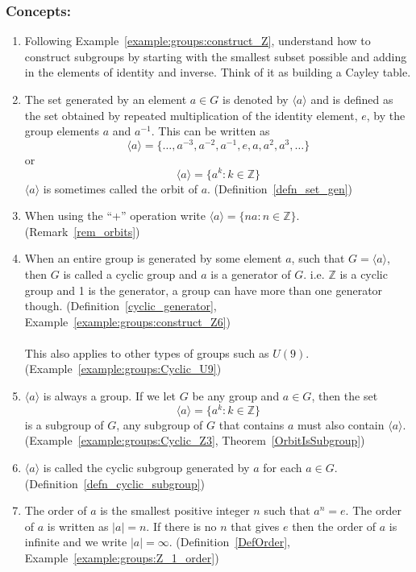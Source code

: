 \subsubsection*{Concepts:}
\begin{enumerate}
\item 
Following Example~\ref{example:groups:construct_Z}, understand how to construct subgroups by starting with the smallest subset possible and adding in the elements of identity and inverse.  Think of it as building a Cayley table.

\item
The set generated by an element $a \in G$ is denoted by $\langle a \rangle$ and is defined as the set obtained by repeated multiplication of the identity element, $e$, by the group elements $a$ and $a^{-1}$.  This can be written as  \[ \langle a \rangle = \{ \ldots, a^{-3}, a^{-2}, a^{-1}, e, a, a^2, a^3, \ldots \} \] or \[ \langle a \rangle = \{ a^{k} : k \in \mathbb Z \} \] $\langle a \rangle$ is sometimes called the orbit of $a$. (Definition~\ref{defn_set_gen})

\item
When using the ``+'' operation write $\langle a \rangle  = \{ na : n \in {\mathbb Z} \}$. (Remark~\ref{rem_orbits})

\item
When an entire group is generated by some element $a$, such that $G = \langle a \rangle$, then $G$ is called a cyclic group and $a$ is a generator of $G$. i.e. ${\mathbb Z}$ is a cyclic group and 1 is the generator, a group can have more than one generator though. (Definition~\ref{cyclic_generator}, Example~\ref{example:groups:construct_Z6})
\\
\\
This also applies to other types of groups such as $U(9)$. (Example~\ref{example:groups:Cyclic_U9})

\item
$\langle a \rangle$ is always a group. If we let $G$ be any group and $a \in G$, then the set \[\langle a \rangle  = \{ a^k : k \in {\mathbb Z}\}\] is a subgroup of $G$, any subgroup of $G$ that contains $a$ must also contain $\langle a \rangle$. (Example~\ref{example:groups:Cyclic_Z3}, Theorem~\ref{OrbitIsSubgroup})

\item
$\langle a \rangle$ is called the cyclic subgroup generated by $a$ for each $a \in G$. (Definition~\ref{defn_cyclic_subgroup})

\item
The order of $a$ is the smallest positive integer $n$ such that $a^n = e$. The order of $a$ is written as $|a| = n$. If there is no $n$ that gives $e$ then the order of $a$ is infinite and we write $|a| = \infty$. (Definition~\ref{DefOrder}, Example~\ref{example:groups:Z_1_order})


\end{enumerate}
